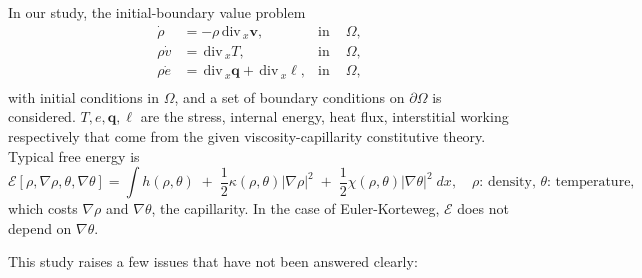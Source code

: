 \documentclass[a4paper,11pt]{article}
\def\div{\,\textrm{div}\,}
\def\E{\mathcal{E}}
\begin{document}
In our study, the initial-boundary value problem 
\begin{equation}
\begin{aligned}
\dot{\rho} &=-\rho \div_x \mathbf{v}, & \text{in } & \Omega,\\
\rho\dot{v} &= \div_x T, & \text{in } & \Omega, \\
\rho\dot{e} &= \div_x \mathbf{q} + \div_x \mathbf{\ell}, & \text{in } & \Omega,\\
\end{aligned}
\end{equation}
with initial conditions in $\Omega$, and a set of boundary conditions on $\partial\Omega$ is considered. $T,e,\mathbf{q},\ell$ are the stress, internal energy, heat flux, interstitial working respectively that come from the given viscosity-capillarity constitutive theory. Typical free energy is
 \begin{equation} \label{eq:free}
  \E[\rho,\nabla\rho,\theta,\nabla\theta] = \int h(\rho,\theta) \;+\; \frac{1}{2}\kappa(\rho,\theta)|\nabla\rho|^2 \;+\; \frac{1}{2}\chi(\rho,\theta)|\nabla\theta|^2 \; dx, \quad \text{$\rho$: density, $\theta$: temperature},
 \end{equation}
which costs $\nabla\rho$ and $\nabla\theta$, the capillarity. In the case of Euler-Korteweg, $\E$ does not depend on $\nabla\theta$. 

This study raises a few issues that have not been answered clearly:
\end{document}
